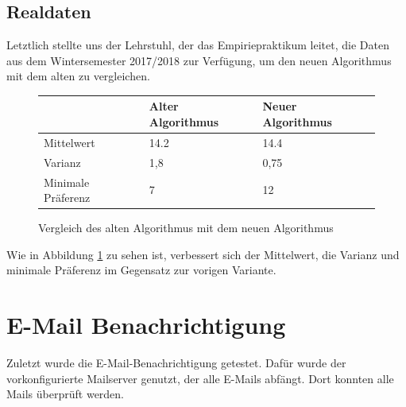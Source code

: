 		\subsection{Realdaten}
		
			Letztlich stellte uns der Lehrstuhl, der das Empiriepraktikum leitet, die Daten aus dem Wintersemester 2017/2018 zur Verfügung, um den neuen Algorithmus mit dem alten zu vergleichen.\newline
			
			\begin{figure}
				\centering
				\begin{tabular}{l|l|l}
					& Alter Algorithmus & Neuer Algorithmus \\
					\hline
					Mittelwert & 14.2 & 14.4 \\
					Varianz & 1,8 & 0,75 \\
					Minimale Präferenz & 7 & 12 \\
				\end{tabular}
				\caption{Vergleich des alten Algorithmus mit dem neuen Algorithmus}
				\label{tab:old_versus_new_algorithm}
			\end{figure}
		
			Wie in Abbildung \ref{tab:old_versus_new_algorithm} zu sehen ist, verbessert sich der Mittelwert, die Varianz und minimale Präferenz im Gegensatz zur vorigen Variante.
		
	\section{E-Mail Benachrichtigung}
		Zuletzt wurde die E-Mail-Benachrichtigung getestet.
		Dafür wurde der vorkonfigurierte Mailserver genutzt, der alle E-Mails abfängt.
		Dort konnten alle Mails überprüft werden.
		
		
		
		
		
		
		
		
		
		
		
		
		
		
		
		
		
		
		
		
		
		
		
		
		
